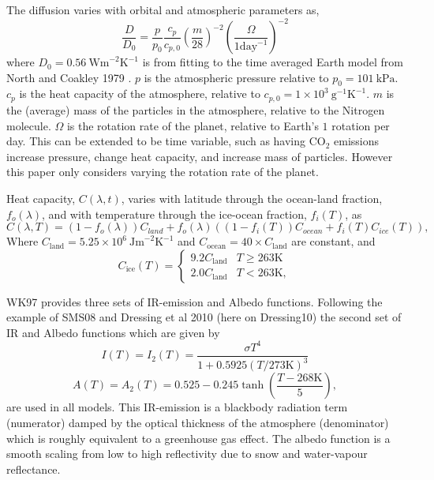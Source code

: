 \documentclass[12pt, onecolumn]{revtex4-2}    %
\newcommand{\heatcap}{\ensuremath{\ \text{Jm}^{-2} \text{K}^{-1}}}
\newcommand{\diffusion}{\ensuremath{\ \text{Wm}^{-2} \text{K}^{-1}}}
\begin{document}
The diffusion varies with orbital and atmospheric parameters as,
\begin{equation}
    \frac{D}{D_0} = \frac{p}{p_0} \frac{c_p}{c_{p,0}} \left(\frac{m}{28}\right)^{-2} \left(\frac{\Omega}{1 \text{day}^{-1}}\right)^{-2}
\end{equation}
where $D_0 = 0.56 \diffusion$ is from fitting to the time averaged Earth model from North and Coakley 1979 \cite{NC79}.
$p$ is the atmospheric pressure relative to $p_0 = 101 \ \text{kPa}$.
$c_p$ is the heat capacity of the atmosphere, relative to $c_{p,0} = 1\times10^3 \ \text{g}^{-1} \text{K}^{-1}$.
$m$ is the (average) mass of the particles in the atmosphere, relative to the Nitrogen molecule.
$\Omega$ is the rotation rate of the planet, relative to Earth's $1$ rotation per day.
This can be extended to be time variable, such as having CO$_2$ emissions increase pressure, change heat capacity, and increase mass of particles.
However this paper only considers varying the rotation rate of the planet.

Heat capacity, $C(\lambda, t)$, varies with latitude through the ocean-land fraction, $f_o(\lambda)$, and with temperature through the ice-ocean fraction, $f_i(T)$, as
\begin{equation}
    C(\lambda, T) = (1 - f_o(\lambda)) C_{land} + f_o(\lambda) ((1-f_i(T)) C_{ocean} + f_i(T) C_{ice}(T)),
\end{equation}
Where $C_{\text{land}} = 5.25\times10^6 \heatcap$ and $C_{\text{ocean}} = 40 \times C_{\text{land}}$ are constant, and
\begin{equation}
    C_{\text{ice}}(T) =
    \begin{cases}
        9.2 C_\text{land} & T \ge 263\text{K} \\
        2.0 C_\text{land} & T < 263\text{K},
    \end{cases}
\end{equation}

WK97 provides three sets of IR-emission and Albedo functions. Following the example of SMS08 and Dressing et al 2010 (here on Dressing10) \cite{Dressing10} the second set of IR and Albedo functions which are given by
\begin{equation}
    I(T) = I_2(T) = \frac{\sigma T^4}{1 + 0.5925 (T / 273 \text{K}) ^ 3}
\end{equation}
\begin{equation}
    A(T) = A_2(T) = 0.525 - 0.245 \tanh\left(\frac{T - 268 \text{K}}{5}\right),
\end{equation}
are used in all models.
This IR-emission is a blackbody radiation term (numerator) damped by the optical thickness of the atmosphere (denominator) which is roughly equivalent to a greenhouse gas effect.
The albedo function is a smooth scaling from low to high reflectivity due to snow and water-vapour reflectance.
\end{document}
